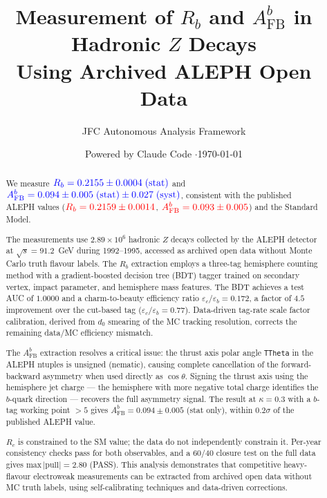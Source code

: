 \documentclass[11pt,a4paper]{article}
\title{Measurement of $R_b$ and $A_\text{FB}^b$ in Hadronic $Z$ Decays\\
Using Archived ALEPH Open Data}
\author{JFC Autonomous Analysis Framework}
\date{Powered by Claude Code \quad$\cdot$\quad \today}
\newcommand{\measured}[1]{\textcolor{blue}{#1}}
\newcommand{\external}[1]{\textcolor{red}{#1}}
\begin{document}
\maketitle

\begin{abstract}
We measure $\measured{R_b = 0.2155 \pm 0.0004\;\text{(stat)}}$ and
$\measured{A_\text{FB}^b = 0.094 \pm 0.005\;\text{(stat)} \pm 0.027\;\text{(syst)}}$,
consistent with the published ALEPH values
($\external{R_b = 0.2159 \pm 0.0014}$,
$\external{A_\text{FB}^b = 0.093 \pm 0.005}$)
and the Standard Model.

The measurements use $2.89 \times 10^6$ hadronic $Z$ decays
collected by the ALEPH detector at $\sqrt{s} = 91.2$~GeV during
1992--1995, accessed as archived open data without Monte Carlo
truth flavour labels.
The $R_b$ extraction employs a three-tag hemisphere counting method
with a gradient-boosted decision tree (BDT) tagger trained on
secondary vertex, impact parameter, and hemisphere mass features.
The BDT achieves a test AUC of $1.0000$ and a charm-to-beauty
efficiency ratio $\varepsilon_c/\varepsilon_b = 0.172$, a factor
of $4.5$ improvement over the cut-based tag
($\varepsilon_c/\varepsilon_b = 0.77$).
Data-driven tag-rate scale factor calibration, derived from $d_0$
smearing of the MC tracking resolution, corrects the remaining
data/MC efficiency mismatch.

The $A_\text{FB}^b$ extraction resolves a critical issue:
the thrust axis polar angle \texttt{TTheta} in the ALEPH ntuples
is unsigned (nematic), causing complete cancellation of the
forward-backward asymmetry when used directly as $\cos\theta$.
Signing the thrust axis using the hemisphere jet charge --- the
hemisphere with more negative total charge identifies the
$b$-quark direction --- recovers the full asymmetry signal.
The result at $\kappa = 0.3$ with a $b$-tag working point
$> 5$ gives $A_\text{FB}^b = 0.094 \pm 0.005$ (stat only),
within $0.2\sigma$ of the published ALEPH value.

$R_c$ is constrained to the SM value; the data do not independently
constrain it.
Per-year consistency checks pass for both observables, and a 60/40
closure test on the full data gives
$\text{max}\,|{\text{pull}}| = 2.80$ (PASS).
This analysis demonstrates that competitive heavy-flavour electroweak
measurements can be extracted from archived open data without MC
truth labels, using self-calibrating techniques and data-driven
corrections.
\end{abstract}
\end{document}
